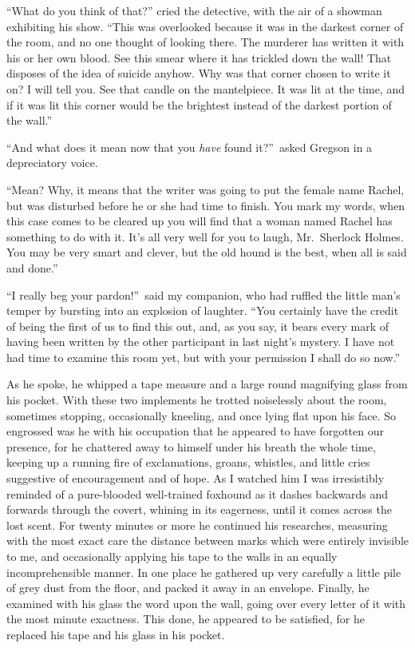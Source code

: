 \documentclass[12pt,english,oneside]{book}
\begin{document}
{}

{}``What do you think of that?'' cried the detective, with the air
of a showman exhibiting his show. {}``This was overlooked because
it was in the darkest corner of the room, and no one thought of looking
there. The murderer has written it with his or her own blood. See
this smear where it has trickled down the wall! That disposes of the
idea of suicide anyhow. Why was that corner chosen to write it on?
I will tell you. See that candle on the mantelpiece. It was lit at
the time, and if it was lit this corner would be the brightest instead
of the darkest portion of the wall.''

{}``And what does it mean now that you \textit{have} found it?''\ asked
Gregson in a depreciatory voice.

{}``Mean? Why, it means that the writer was going to put the female
name Rachel, but was disturbed before he or she had time to finish.
You mark my words, when this case comes to be cleared up you will
find that a woman named Rachel has something to do with it. It's all
very well for you to laugh, Mr.\ Sherlock Holmes. You may be very
smart and clever, but the old hound is the best, when all is said
and done.''

{}``I really beg your pardon!''\ said my companion, who had ruffled
the little man's temper by bursting into an explosion of laughter.
{}``You certainly have the credit of being the first of us to find
this out, and, as you say, it bears every mark of having been written
by the other participant in last night's mystery. I have not had time
to examine this room yet, but with your permission I shall do so now.''

As he spoke, he whipped a tape measure and a large round magnifying
glass from his pocket. With these two implements he trotted noiselessly
about the room, sometimes stopping, occasionally kneeling, and once
lying flat upon his face. So engrossed was he with his occupation
that he appeared to have forgotten our presence, for he chattered
away to himself under his breath the whole time, keeping up a running
fire of exclamations, groans, whistles, and little cries suggestive
of encouragement and of hope. As I watched him I was irresistibly
reminded of a pure-blooded well-trained foxhound as it dashes backwards
and forwards through the covert, whining in its eagerness, until it
comes across the lost scent. For twenty minutes or more he continued
his researches, measuring with the most exact care the distance between
marks which were entirely invisible to me, and occasionally applying
his tape to the walls in an equally incomprehensible manner. In one
place he gathered up very carefully a little pile of grey dust from
the floor, and packed it away in an envelope. Finally, he examined
with his glass the word upon the wall, going over every letter of
it with the most minute exactness. This done, he appeared to be satisfied,
for he replaced his tape and his glass in his pocket.
\end{document}
